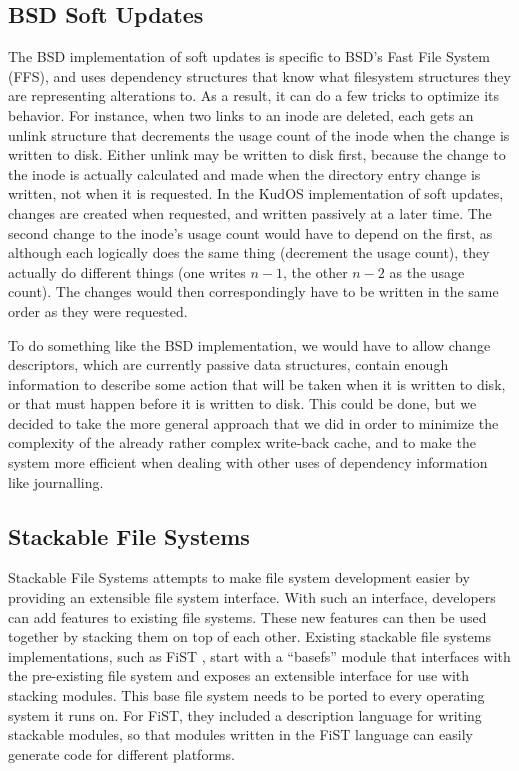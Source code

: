 \subsection{BSD Soft Updates}

The BSD implementation of soft updates \cite{ganger00soft} is specific to BSD's
Fast File System (FFS), and uses dependency structures that know what filesystem
structures they are representing alterations to. As a result, it can do a few
tricks to optimize its behavior. For instance, when two links to an inode are
deleted, each gets an unlink structure that decrements the usage count of the
inode when the change is written to disk. Either unlink may be written to disk
first, because the change to the inode is actually calculated and made when the
directory entry change is written, not when it is requested. In the KudOS
implementation of soft updates, changes are created when requested, and written
passively at a later time. The second change to the inode's usage count would
have to depend on the first, as although each logically does the same thing
(decrement the usage count), they actually do different things (one writes $n -
1$, the other $n - 2$ as the usage count). The changes would then
correspondingly have to be written in the same order as they were requested.

To do something like the BSD implementation, we would have to allow change
descriptors, which are currently passive data structures, contain enough
information to describe some action that will be taken when it is written to
disk, or that must happen before it is written to disk. This could be done, but
we decided to take the more general approach that we did in order to minimize
the complexity of the already rather complex write-back cache, and to make the
system more efficient when dealing with other uses of dependency information
like journalling.

\subsection{Stackable File Systems}

Stackable File Systems \cite{heidemann93stack} attempts to make file system
development easier by providing an extensible file system interface. With such
an interface, developers can add features to existing file systems. These new
features can then be used together by stacking them on top of each other.
Existing stackable file systems implementations, such as FiST
\cite{zadok00fist}, start with a ``basefs'' module that interfaces with the
pre-existing file system and exposes an extensible interface for use with
stacking modules. This base file system needs to be ported to every operating
system it runs on. For FiST, they included a description language for writing
stackable modules, so that modules written in the FiST language can easily
generate code for different platforms.

